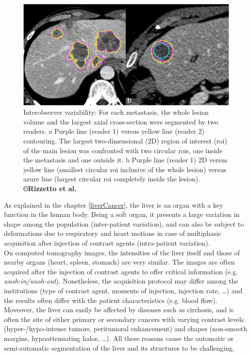 \begin{figure}[!h]
	\centering        
	\includegraphics[width=0.7\linewidth]{./images/interObs1}
	\caption{Interobserver variability: For each metastasis, the whole lesion volume and the largest axial cross-section were segmented by two readers. a Purple line (reader 1) versus yellow line (reader 2) contouring. The largest two-dimensional (2D) region of interest (\ac{roi}) of the main lesion was confronted with two circular \ac{roi}s, one inside the metastasis and one outside it. b Purple line (reader 1) 2D versus yellow line (smallest circular \ac{roi} inclusive of the whole lesion) versus azure line (largest circular \ac{roi} completely inside the lesion). \textbf{©Rizzetto et al. \cite{Rizzetto2020}}}
	\label{interobserver_var}
\end{figure} 

As explained in the chapter \ref{liverCancer}, the liver is an
organ with a key function in the human body. Being a soft organ, it
presents a large variation in shape among the population (inter-patient
variation), and can also be subject to deformations due to respiratory
and heart motions in case of multiphasic acquisition after injection of
contrast agents (intra-patient variation).\\
On computed tomography images, the intensities of the liver itself and
those of nearby organs (heart, spleen, stomach) are very similar. The
images are often acquired after the injection of contrast agents to
offer critical information (e.g. \emph{wash-in/wash-out}). Nonetheless,
the acquisition protocol may differ among the institutions (type of
contrast agent, moments of injection, injection rate, \ldots{}) and the
results often differ with the patient characteristics (e.g. blood flow).
Moveover, the liver can easily be affected by diseases such as
cirrhosis, and is often the site of either primary or secondary cancers
with varying contrast levels (hyper-/hypo-intense tumors, peritumoral
enhancement) and shapes (non-smooth margins, hypoattenuating halos,
\ldots{}). All these reasons cause the automatic or semi-automatic
segmentation of the liver and its structures to be challenging.

